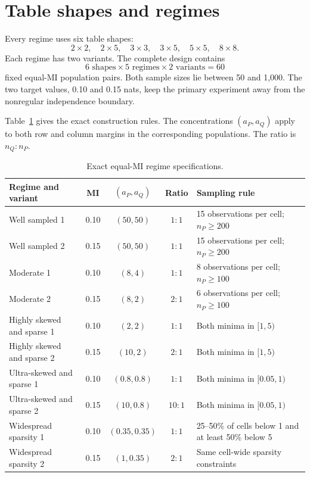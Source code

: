 \section{Table shapes and regimes}

Every regime uses six table shapes:
\begin{equation}
  2\times2,\quad 2\times5,\quad 3\times3,\quad
  3\times5,\quad 5\times5,\quad 8\times8.
  \label{eq:design-shapes}
\end{equation}
Each regime has two variants. The complete design contains
\begin{equation}
  6\text{ shapes}\times5\text{ regimes}\times2\text{ variants}
  =60
\end{equation}
fixed equal-MI population pairs. Both sample sizes lie between 50 and 1,000.
The two target values, 0.10 and 0.15 nats, keep the primary experiment away
from the nonregular independence boundary.

Table~\ref{tab:regime-designs} gives the exact construction rules. The
concentrations \((a_P,a_Q)\) apply to both row and column margins in the
corresponding populations. The ratio is \(n_Q:n_P\).

\begin{table}[htbp]
\centering
\caption{Exact equal-MI regime specifications.}
\label{tab:regime-designs}
\small
\begin{tabularx}{\textwidth}{@{}XcccX@{}}
\toprule
Regime and variant & MI & \((a_P,a_Q)\) & Ratio & Sampling rule \\
\midrule
Well sampled 1 & 0.10 & \((50,50)\) & \(1:1\) & 15 observations per cell; \(n_P\ge200\) \\
Well sampled 2 & 0.15 & \((50,50)\) & \(1:1\) & 15 observations per cell; \(n_P\ge200\) \\
Moderate 1 & 0.10 & \((8,4)\) & \(1:1\) & 8 observations per cell; \(n_P\ge100\) \\
Moderate 2 & 0.15 & \((8,2)\) & \(2:1\) & 6 observations per cell; \(n_P\ge100\) \\
Highly skewed and sparse 1 & 0.10 & \((2,2)\) & \(1:1\) & Both minima in \([1,5)\) \\
Highly skewed and sparse 2 & 0.15 & \((10,2)\) & \(2:1\) & Both minima in \([1,5)\) \\
Ultra-skewed and sparse 1 & 0.10 & \((0.8,0.8)\) & \(1:1\) & Both minima in \([0.05,1)\) \\
Ultra-skewed and sparse 2 & 0.15 & \((10,0.8)\) & \(10:1\) & Both minima in \([0.05,1)\) \\
Widespread sparsity 1 & 0.10 & \((0.35,0.35)\) & \(1:1\) & 25--50\% of cells below 1 and at least 50\% below 5 \\
Widespread sparsity 2 & 0.15 & \((1,0.35)\) & \(2:1\) & Same cell-wide sparsity constraints \\
\bottomrule
\end{tabularx}
\end{table}

